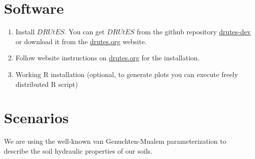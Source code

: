 \documentclass[
10pt, %
a4paper, %
oneside, %
headinclude,footinclude, %
BCOR5mm, %
]{scrartcl}
\begin{document}
\section{Software}

\begin{enumerate}
\item Install $DRUtES$. You can get $DRUtES$ from the github repository \href{https://github.com/michalkuraz/drutes-dev/} {drutes-dev} or download it from the \href{http://drutes.org/public/?core=account}{drutes.org} website. 
\item Follow website instructions on \href{http://drutes.org/public/?core=account}{drutes.org} for the installation.
\item Working R installation (optional, to generate plots you can execute freely distributed R script) 
\end{enumerate}

\newpage
\section{Scenarios}

We are using the well-known van Genuchten-Mualem parameterization to describe the soil hydraulic properties of our soils. 

\begin{table}[!h]
\centering
\caption{\label{tab_heat}Material properties needed for scenarios.}
\end{table}
\end{document}
